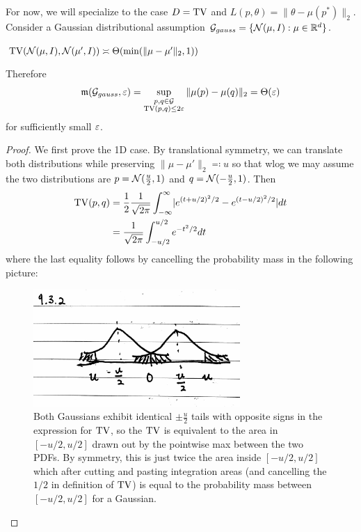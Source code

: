 For now, we will specialize to the case $D = \operatorname{TV}$ and $L(p,  \theta) = \|\theta - \mu(p^*)\|_2$.
Consider a Gaussian distributional assumption $\mathcal{G}_{gauss} = \{\mathcal{N}(\mu, I) : \mu \in \mathbb{R}^{d}\}$.

\begin{lemma}\label{lem:gauss-tv}
    $\operatorname{TV}(\mathcal{N}(\mu, I), \mathcal{N}(\mu', I)) \asymp \Theta(\min(\|\mu - \mu'\|_2, 1))$

    Therefore
    \begin{align}
         \mathfrak{m}(\mathcal{G}_{gauss}, \varepsilon) = \sup_{\substack{p,q \in \mathcal{G}\\ \operatorname{TV}(p,q) \leq 2 \varepsilon}} \|\mu(p) - \mu(q)\|_2 = \Theta(\varepsilon)
    \end{align}
    for sufficiently small $\varepsilon$.
\end{lemma}

\begin{proof}
    We first prove the 1D case. By translational symmetry, we can translate both
    distributions while preserving $\|\mu - \mu'\|_2 \eqqcolon u$ so that wlog we may
    assume the two distributions are $p = \mathcal{N}(\frac{u}{2}, 1)$ and $q = \mathcal{N}(-\frac{u}{2}, 1)$.
    Then
    \begin{align}
        \operatorname{TV}(p,q)
        &= \frac{1}{2} \frac{1}{\sqrt{2\pi}} \int_{-\infty}^\infty \lvert e^{(t + u/2)^2/2} - e^{(t-u/2)^2/2}\rvert dt \\
        &= \frac{1}{\sqrt{2\pi}} \int_{-u/2}^{u/2} e^{-t^2/2} dt \label{eq:9-3-int}
    \end{align}
    where the last equality follows by cancelling the probability mass in the following picture:
    \begin{figure}[H]
        \centering
        \includegraphics[width=0.7\textwidth]{figures/9-3-2.png}
        \caption{Both Gaussians exhibit identical $\pm \frac{u}{2}$ tails with opposite signs
            in the expression for $\operatorname{TV}$, so the $\operatorname{TV}$ is equivalent to the area in $[-u/2, u/2]$ drawn
            out by the pointwise max between the two PDFs. By symmetry, this is just twice the area
            inside $[-u/2, u/2]$ which after cutting and pasting integration areas (and cancelling the $1/2$
            in definition of $\operatorname{TV}$) is equal
            to the probability mass between $[-u/2,u/2]$ for a Gaussian.}
    \end{figure}


\end{proof}
